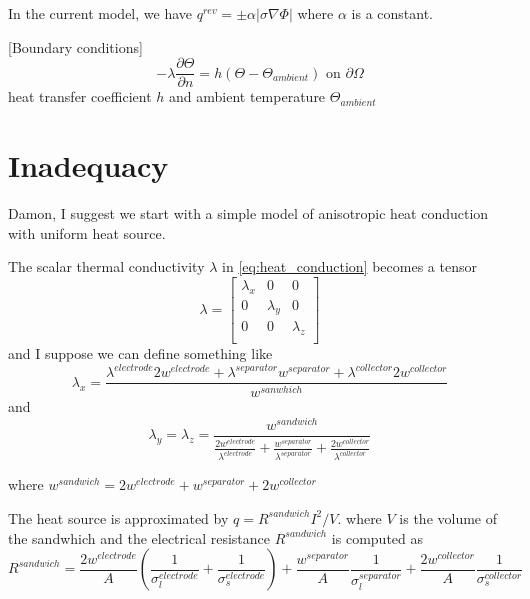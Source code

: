 \documentclass[10pt, oneside]{article}   	%
\begin{document}
In the current model, we have $q^{rev} = \pm \alpha |\sigma \nabla\Phi|$ where
$\alpha$ is a constant.

[Boundary conditions]
\begin{equation}
- \lambda \frac{\partial \Theta}{\partial n} = h (\Theta - \Theta_{ambient}) \text{ on } \partial\Omega
\end{equation}
heat transfer coefficient $h$ and ambient temperature $\Theta_{ambient}$

\newpage
\section{Inadequacy}
Damon, I suggest we start with a simple model of anisotropic heat conduction
with uniform heat source.

The scalar thermal conductivity $\lambda$ in \eqref{eq:heat_conduction} becomes 
a tensor 
\begin{equation}
\lambda = 
\begin{bmatrix}
\lambda_x & 0         & 0         \\
0         & \lambda_y & 0         \\
0         & 0         & \lambda_z \\
\end{bmatrix}
\end{equation}
and I suppose we can define something like
\begin{equation}
\lambda_x = \frac{\lambda^{electrode} 2w^{electrode} + \lambda^{separator} w^{separator} + \lambda^{collector} 2w^{collector}}{w^{sanwhich}}
\end{equation}
and
\begin{equation}
\lambda_y = \lambda_z = \frac{w^{sandwich}}{\frac{2w^{electrode}}{\lambda^{electrode}} + \frac{w^{separator}}{\lambda^{separator}} + \frac{2w^{collector}}{\lambda^{collector}}}
\end{equation}

where $w^{sandwich}=2w^{electrode}+w^{separator}+2w^{collector}$

The heat source is approximated by $q = R^{sandwich} I^2 / V$.
where $V$ is the volume of the sandwhich and the electrical resistance
$R^{sandwich}$ is computed as
\begin{equation}
R^{sandwich} = 
\frac{2w^{electrode}}{A} (\frac{1}{\sigma_l^{electrode}} + \frac{1}{\sigma_s^{electrode}})
+ \frac{w^{separator}}{A} \frac{1}{\sigma_l^{separator}}
+ \frac{2w^{collector}}{A} \frac{1}{\sigma_s^{collector}}
\end{equation}
\end{document}
